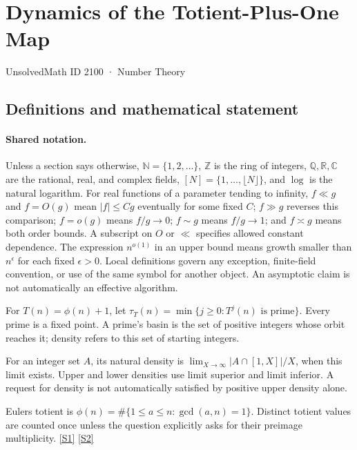 \documentclass[11pt,a4paper]{article}
\newcommand{\N}{\mathbb{N}}
\newcommand{\Z}{\mathbb{Z}}
\newcommand{\Q}{\mathbb{Q}}
\newcommand{\R}{\mathbb{R}}
\newcommand{\C}{\mathbb{C}}
\newcommand{\sref}[2]{\hyperlink{source:#1:#2}{[S#2]}}
\begin{document}

\setcounter{section}{2099}

\section{Dynamics of the Totient-Plus-One Map}\label{2100}

{\small\sffamily UnsolvedMath ID 2100 · Number Theory}

\subsection{Definitions and mathematical statement}

\paragraph{Shared notation.}Unless a section says otherwise, $\N=\{1,2,\ldots\}$,
$\Z$ is the ring of integers, $\Q,\R,\C$ are the rational, real, and complex
fields, $[N]=\{1,\ldots,\lfloor N\rfloor\}$, and $\log$ is the natural
logarithm. For real functions of a parameter tending to infinity,
$f\ll g$ and $f=O(g)$ mean $|f|\leq Cg$ eventually for some fixed $C$;
$f\gg g$ reverses this comparison; $f=o(g)$ means $f/g\to0$;
$f\sim g$ means $f/g\to1$; and $f\asymp g$ means both order bounds.
A subscript on $O$ or $\ll$ specifies allowed constant dependence.
The expression $n^{o(1)}$ in an upper bound means growth smaller than
$n^\epsilon$ for each fixed $\epsilon>0$. Local definitions govern any
exception, finite-field convention, or use of the same symbol for another
object. An asymptotic claim is not automatically an effective algorithm.



For $T(n)=\phi(n)+1$, let $\tau_T(n)=\min\{j\geq0:T^j(n)\text{ is prime}\}$. Every prime is a fixed point. A prime's basin is the set of positive integers whose orbit reaches it; density refers to this set of starting integers.

For an integer set $A$, its natural density is $\lim_{X\to\infty}|A\cap[1,X]|/X$, when this limit exists. Upper and lower densities use limit superior and limit inferior. A request for density is not automatically satisfied by positive upper density alone.

Euler\textquotesingle s totient is $\phi(n)=\#\{1\leq a\leq n:\gcd(a,n)=1\}$. Distinct totient values are counted once unless the question explicitly asks for their preimage multiplicity. \sref{2100}{1} \sref{2100}{2}
\end{document}
